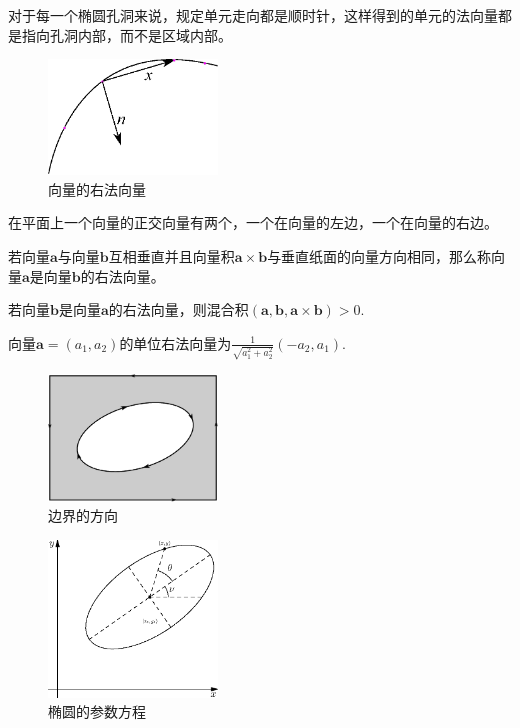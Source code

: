 对于每一个椭圆孔洞来说，规定单元走向都是顺时针，这样得到的单元的法向量都是指向孔洞内部，而不是区域内部。
\begin{figure}[h]
	\begin{center}
		\includegraphics[width=0.4\textwidth]{pics/vec_right.eps}
		\caption{向量的右法向量}
	\end{center}
	\label{fig_vecright}
\end{figure}
在平面上一个向量的正交向量有两个，一个在向量的左边，一个在向量的右边。
\begin{definition}
	若向量$\mathbf{a}$与向量$\mathbf{b}$互相垂直并且向量积$\mathbf{a}\times\mathbf{b}$与垂直纸面的向量方向相同，那么称向量$\mathbf{a}$是向量$\mathbf{b}$的右法向量。
\end{definition}
\begin{lemma}
	若向量$\mathbf{b}$是向量$\mathbf{a}$的右法向量，则混合积$(\mathbf{a},\mathbf{b},\mathbf{a}\times\mathbf{b}) > 0 $.	
	\label{lem_vec_right}
\end{lemma}
\begin{lemma}
	向量$\mathbf{a}=(a_1,a_2)$的单位右法向量为$\frac{1}{\sqrt{a_1^2+a_2^2}}(-a_2,a_1)$.
	\label{lemma_vec_right}
\end{lemma}
\begin{figure}[h]
	\begin{center}
		\includegraphics[width=0.4\textwidth]{pics/hole_towards.eps}
	\end{center}
	\caption{边界的方向}
	\label{fig_towards}
\end{figure}
\begin{figure}[h]
	\begin{center}
		\includegraphics[width=0.4\textwidth]{pics/ellipse.eps}
	\end{center}
	\caption{椭圆的参数方程}
	\label{fig_ellipse_eq}
\end{figure}
